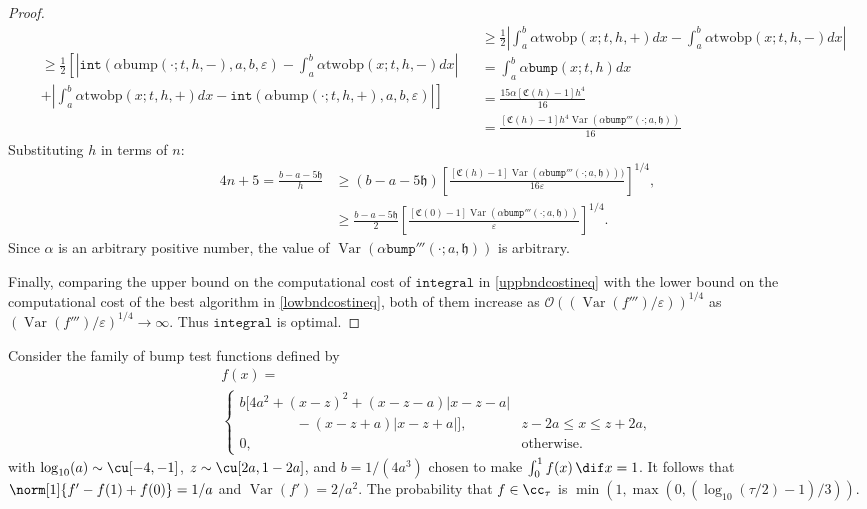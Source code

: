 \documentclass{iitthesis}
\DeclareMathOperator{\Var}{Var}
\theoremstyle{definition}
\theoremstyle{remark}
\begin{document}
\begin{proof}
\begin{subequations}
\begin{multline*}
  \end{multline*}
  \begin{multline*}
    \ge\frac{1}{2}\left[\right.\left|\texttt{int}(\alpha\text{bump}(\cdot;t,h,-),a,b,\varepsilon)-\int_{a}^{b}\alpha\text{twobp}(x;t,h,-)dx\right|\\
    +\left|\int_{a}^{b}\alpha\text{twobp}(x;t,h,+)dx-\texttt{int}(\alpha\text{bump}(\cdot;t,h,+),a,b,\varepsilon)\right|\left.\right]
  \end{multline*}
  \begin{align*}
     &\ge\frac{1}{2}\left|\int_{a}^{b}\alpha\text{twobp}(x;t,h,+)dx-\int_{a}^{b}\alpha\text{twobp}(x;t,h,-)dx\right|\\
     &=\int_{a}^{b}\alpha\texttt{bump}(x;t,h)dx\\
     &=\frac{15\alpha[\mathfrak{C}(h)-1]h^4}{16}\\
     &=\frac{[\mathfrak{C}(h)-1]h^4\Var(\alpha\texttt{bump}'''(\cdot;a,\mathfrak{h}))}{16}
  \end{align*}
  \end{subequations}
  Substituting $h$  in terms of $n$:
      \begin{align*}
        4n+5=\frac{b-a-5\mathfrak{h}}{h}&\ge(b-a-5\mathfrak{h})\left[\frac{[\mathfrak{C}(h)-1]\Var(\alpha \texttt{bump}'''(\cdot;a,\mathfrak{h})))}{16\varepsilon}\right]^{1/4},\\
        &\ge\frac{b-a-5\mathfrak{h}}{2}\left[\frac{[\mathfrak{C}(0)-1]\Var(\alpha \texttt{bump}'''(\cdot;a,\mathfrak{h}))}{\varepsilon}\right]^{1/4}.
    \end{align*}
    Since $\alpha$ is an arbitrary positive number, the value of $\Var(\alpha \texttt{bump}'''(\cdot;a,\mathfrak{h}))$ is arbitrary.

    Finally, comparing the upper bound on the computational cost of $\texttt{integral}$ in \eqref{uppbndcostineq} with the lower bound on the computational cost of the best algorithm in \eqref{lowbndcostineq}, both of them increase as $\mathcal{O}((\Var(f''')/\varepsilon))^{1/4}$ as $(\Var(f''')/\varepsilon)^{1/4}\rightarrow \infty$. Thus $\texttt{integral}$ is optimal.
\end{proof}


Consider the family of bump test functions defined by
\begin{multline}\label{testfun}
f(x)= \\
\begin{cases}
\displaystyle  b[4a^2 + (x-z)^2 + (x-z-a)|x-z-a|\\
\qquad \qquad -(x-z+a)|x-z+a|], & z-2a\leq x\leq z+2a,\\[2ex]
\displaystyle  0, & \text{otherwise}.
\end{cases}
\end{multline}
with  $\log_{10}(a) \sim \cu[-4,-1]$, $z \sim \cu[2a,1-2a]$, and $b=1/(4a^3)$ chosen to make $\int_0^1 f(x) \, \dif x = 1$.  It follows that $\norm[1]{f'-f(1)+f(0)}=1/a$ and $\Var(f')=2/a^2$.  The probability that $f \in \cc_{\tau}$ is $\min\left(1,\max(0,\left(\log_{10}(\tau/2)-1\right)/3)\right).$
\end{document}
